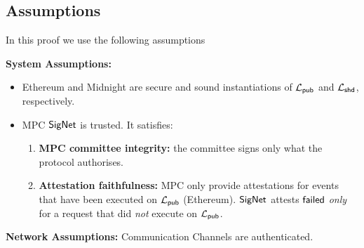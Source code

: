 \subsection{Assumptions}
\label{sec:soundnessassumptions}
In this proof we use the following assumptions

\vspace{5pt}
\noindent
\textbf{System Assumptions:}
\begin{itemize}
    \item Ethereum  and Midnight are secure and sound  instantiations of $\mathcal{L}_{\mathsf{pub}}$ and $\mathcal{L}_{\mathsf{shd}}$, respectively.

    \item MPC $\mathsf{SigNet}$ is trusted. It satisfies:
    \begin{enumerate}
        \item  \textbf{MPC committee integrity:}  the committee signs only what the protocol authorises.
        \item \textbf{Attestation faithfulness:}  MPC only provide attestations for events that have been executed on $\mathcal{L}_{\mathsf{pub}}$ (Ethereum).
        $\mathsf{SigNet}$ attests $\mathsf{failed}$ \emph{only} for a request that did \emph{not} execute on $\mathcal{L}_{\mathsf{pub}}$.

    \end{enumerate}
\end{itemize}

\vspace{5pt}
\noindent
\textbf{Network Assumptions:}  Communication Channels are authenticated.


